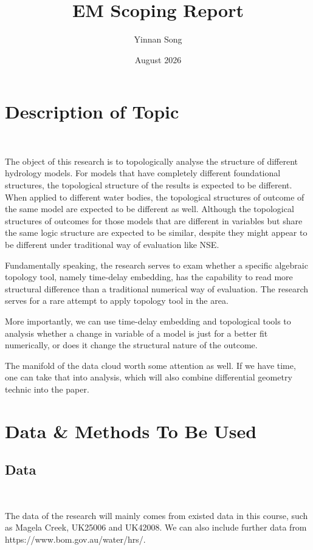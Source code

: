 \documentclass{article}
\title{EM Scoping Report}
\author{Yinnan Song}
\date{August 2026}
\begin{document}
\maketitle

\section{Description of Topic}

\ 

The object of this research is to topologically analyse the structure of different hydrology models. For models that have completely different foundational structures, the topological structure of the results is expected to be different. When applied to different water bodies, the topological structures of outcome of the same model are expected to be different as well. Although the topological structures of outcomes for those models that are different in variables but share the same logic structure are expected to be similar, despite they might appear to be different under traditional way of evaluation like NSE.

Fundamentally speaking, the research serves to exam whether a specific algebraic topology tool, namely time-delay embedding, has the capability to read more structural difference than a traditional numerical way of evaluation. The research serves for a rare attempt to apply topology tool in the area. 

More importantly, we can use time-delay embedding and topological tools to analysis whether a change in variable of a model is just for a better fit numerically, or does it change the structural nature of the outcome.

The manifold of the data cloud worth some attention as well. If we have time, one can take that into analysis, which will also combine differential geometry technic into the paper.

\section{Data \& Methods To Be Used}
\subsection{Data}

\ 

The data of the research will mainly comes from existed data in this course, such as Magela Creek, UK25006 and UK42008. We can also include further data from https://www.bom.gov.au/water/hrs/.
\end{document}
